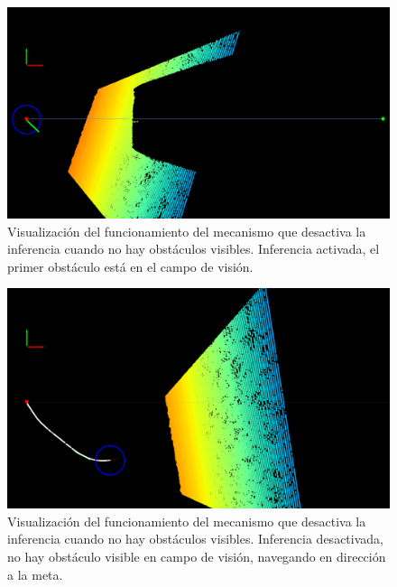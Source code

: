 \begin{figure}[H]
    \centering
    \includegraphics[scale=0.225]{partes/ImgJoao/depth-dual-panel-1-first-obs.png}
    \caption[Visualización del funcionamiento del mecanismo que desactiva la inferencia cuando no hay obstáculos visibles. Inferencia activada, el primer obstáculo está en el campo de visión.]{Visualización del funcionamiento del mecanismo que desactiva la inferencia cuando no hay obstáculos visibles. Inferencia activada, el primer obstáculo está en el campo de visión.}
    \label{fig:depth-dual-panel-1}
\end{figure}

\begin{figure}[H]
    \centering
    \includegraphics[scale=0.225]{partes/ImgJoao/depth-dual-panel-2-no-obs.png}
    \caption[Visualización del funcionamiento del mecanismo que desactiva la inferencia cuando no hay obstáculos visibles. Inferencia desactivada, no hay obstáculo visible en campo de visión, navegando en dirección a la meta.]{Visualización del funcionamiento del mecanismo que desactiva la inferencia cuando no hay obstáculos visibles. Inferencia desactivada, no hay obstáculo visible en campo de visión, navegando en dirección a la meta.}
    \label{fig:depth-dual-panel-2}
\end{figure}

